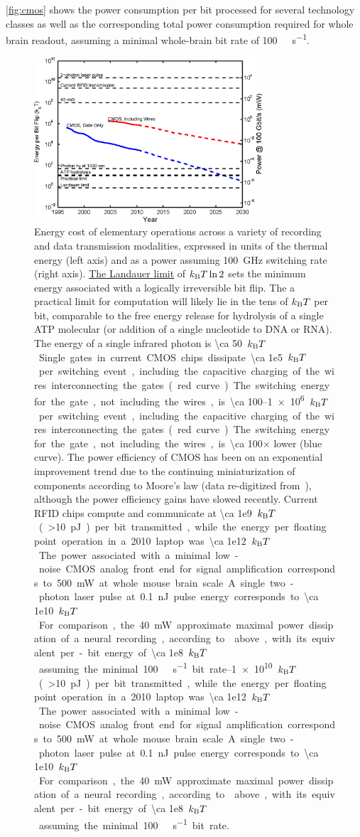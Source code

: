 \autoref{fig:cmos} shows the power consumption per bit processed for several technology classes as well as the corresponding total power consumption required for whole brain readout, assuming a minimal whole-brain bit rate of \SI{100}{\giga\bit\per\second}.

\begin{figure}[htbp]
\caption{
Energy cost of elementary operations across a variety of recording and data transmission modalities, expressed in units of the thermal energy (left axis) and as a power assuming \SI{100}{\giga\hertz} switching rate (right axis). \hyperref[eq:landauer]{The Landauer limit} of $k_{\text{\scriptsize B}} T \ln 2$ sets the minimum energy associated with a logically irreversible bit flip. The a practical limit for computation will likely lie in the tens of $k_{\text{\scriptsize B}} T$ per bit, comparable to the free energy release for hydrolysis of a single ATP molecular (or addition of a single nucleotide to DNA or RNA). The energy of a single infrared photon is \SI{\ca 50}{$k_{\text{\scriptsize B}} T$}. Single gates in current CMOS chips dissipate \SIrange{\ca 1e5}{1e6}{$k_{\text{\scriptsize B}} T$} per switching event, including the capacitive charging of the wires interconnecting the gates (red curve). The switching energy for the gate, not including the wires, is \num{\ca 100}$\times$ lower (blue curve). The power efficiency of CMOS has been on an exponential improvement trend due to the continuing miniaturization of components according to Moore's law (data re-digitized from~\cite{tucker11}), although the power efficiency gains have slowed recently. Current RFID chips compute and communicate at \SIrange{\ca 1e9}{1e10}{$k_{\text{\scriptsize B}} T$} (\SI{>10}{\pico\joule}) per bit transmitted, while the energy per floating point operation in a 2010 laptop was \SI{\ca 1e12}{$k_{\text{\scriptsize B}} T$}. The power associated with a minimal low-noise CMOS analog front end for signal amplification corresponds to \SI{500}{\milli\watt} at whole mouse brain scale. A single two-photon laser pulse at \SI{0.1}{\nano\joule} pulse energy corresponds to \SI{\ca 1e10}{$k_{\text{\scriptsize B}} T$}. For comparison, the \SI{40}{\milli\watt} approximate maximal power dissipation of a neural recording, according to  above, with its equivalent per-bit energy of \SI{\ca 1e8}{$k_{\text{\scriptsize B}} T$} assuming the minimal \SI{100}{\giga\bit\per\second} bit rate.
}
\label{fig:cmos}
\centering
\includegraphics[width=0.76\textwidth]{figs/Fig4.eps}
\end{figure}

